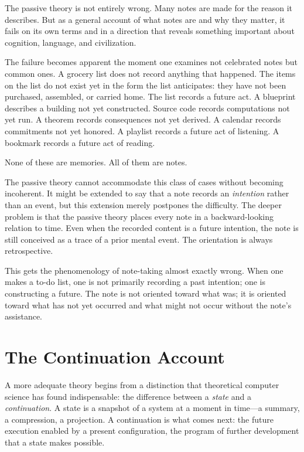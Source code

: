 \documentclass[12pt, a4paper, openany]{book}
\theoremstyle{plain}
\theoremstyle{definition}
\theoremstyle{remark}
\begin{document}
The passive theory is not entirely wrong. Many notes are made for the reason it
describes. But as a general account of what notes are and why they matter, it
fails on its own terms and in a direction that reveals something important about
cognition, language, and civilization.

The failure becomes apparent the moment one examines not celebrated notes but
common ones. A grocery list does not record anything that happened. The items on
the list do not exist yet in the form the list anticipates: they have not been
purchased, assembled, or carried home. The list records a future act. A blueprint
describes a building not yet constructed. Source code records computations not yet
run. A theorem records consequences not yet derived. A calendar records commitments
not yet honored. A playlist records a future act of listening. A bookmark records
a future act of reading.

None of these are memories. All of them are notes.

The passive theory cannot accommodate this class of cases without becoming
incoherent. It might be extended to say that a note records an \emph{intention}
rather than an event, but this extension merely postpones the difficulty. The
deeper problem is that the passive theory places every note in a backward-looking
relation to time. Even when the recorded content is a future intention, the note
is still conceived as a trace of a prior mental event. The orientation is always
retrospective.

This gets the phenomenology of note-taking almost exactly wrong. When one makes a
to-do list, one is not primarily recording a past intention; one is constructing
a future. The note is not oriented toward what was; it is oriented toward what
has not yet occurred and what might not occur without the note's assistance.

\section{The Continuation Account}

A more adequate theory begins from a distinction that theoretical computer science
has found indispensable: the difference between a \emph{state} and a
\emph{continuation}. A state is a snapshot of a system at a moment in time---a
summary, a compression, a projection. A continuation is what comes next: the
future execution enabled by a present configuration, the program of further
development that a state makes possible.
\end{document}
